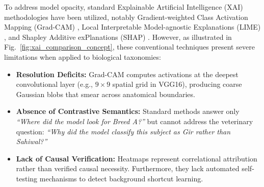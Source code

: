 \documentclass[conference]{IEEEtran}
\begin{document}
To address model opacity, standard Explainable Artificial Intelligence (XAI) methodologies have been utilized, notably Gradient-weighted Class Activation Mapping (Grad-CAM) \cite{selvaraju2017gradcam}, Local Interpretable Model-agnostic Explanations (LIME) \cite{ribeiro2016lime}, and Shapley Additive exPlanations (SHAP) \cite{lundberg2017shap}. However, as illustrated in Fig.~\ref{fig:xai_comparison_concept}, these conventional techniques present severe limitations when applied to biological taxonomies:
\begin{itemize}
    \item \textbf{Resolution Deficits:} Grad-CAM computes activations at the deepest convolutional layer (e.g., $9 \times 9$ spatial grid in VGG16), producing coarse Gaussian blobs that smear across anatomical boundaries.
    \item \textbf{Absence of Contrastive Semantics:} Standard methods answer only \textit{``Where did the model look for Breed A?''} but cannot address the veterinary question: \textit{``Why did the model classify this subject as Gir rather than Sahiwal?''}
    \item \textbf{Lack of Causal Verification:} Heatmaps represent correlational attribution rather than verified causal necessity. Furthermore, they lack automated self-testing mechanisms to detect background shortcut learning.
\end{itemize}
\end{document}
